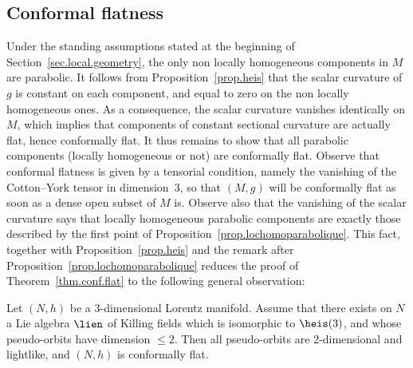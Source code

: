 \subsection{Conformal flatness}\label{sec.conformal.flatness}
Under the standing assumptions stated at the beginning of Section~\ref{sec.local.geometry}, the only non locally homogeneous components in $M$ are parabolic. It follows from Proposition~\ref{prop.heis} that the scalar curvature of $g$ is constant on each component, and equal to zero on the non locally homogeneous ones. As a consequence, the scalar curvature vanishes identically on $M$, which implies that components of constant sectional curvature are actually flat, hence conformally flat. It thus remains to show that all parabolic components (locally homogeneous or not) are conformally flat. Observe that conformal flatness is given by a tensorial condition, namely the vanishing of the Cotton--York tensor in dimension~$3$, so that $(M,g)$ will be conformally flat as soon as a dense open subset of $M$ is. Observe also that the vanishing of the scalar curvature says that locally homogeneous parabolic components are exactly those described by the first point of Proposition~\ref{prop.lochomoparabolique}. This fact, together with Proposition~\ref{prop.heis} and the remark after Proposition~\ref{prop.lochomoparabolique} reduces the proof of Theorem~\ref{thm.conf.flat} to the following general observation:

\begin{prop}\label{prop.heisenberg.flat}
Let $(N,h)$ be a $3$-dimensional Lorentz manifold. Assume that there exists on $N$ a Lie algebra $\lien$ of Killing fields which is isomorphic to $\heis(3)$, and whose pseudo-orbits have dimension $\leq 2$. Then all pseudo-orbits are $2$-dimensional and lightlike, and $(N,h)$ is conformally flat.
\end{prop}

